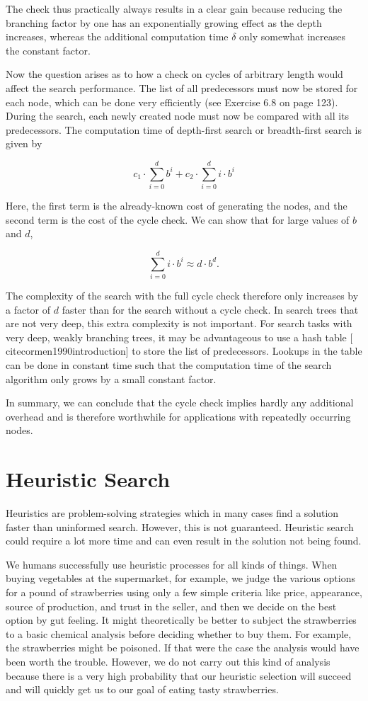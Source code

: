 \documentclass[10pt]{book}
\begin{document}
The check thus practically always results in a clear gain because reducing the branching factor by one has an exponentially growing effect as the depth increases, whereas the additional computation time $\delta$ only somewhat increases the constant factor.

Now the question arises as to how a check on cycles of arbitrary length would affect the search performance. The list of all predecessors must now be stored for each node, which can be done very efficiently (see Exercise 6.8 on page 123). During the search, each newly created node must now be compared with all its predecessors. The computation time of depth-first search or breadth-first search is given by

$$
c_{1} \cdot \sum_{i=0}^{d} b^{i}+c_{2} \cdot \sum_{i=0}^{d} i \cdot b^{i}
$$

Here, the first term is the already-known cost of generating the nodes, and the second term is the cost of the cycle check. We can show that for large values of $b$ and $d$,

$$
\sum_{i=0}^{d} i \cdot b^{i} \approx d \cdot b^{d} .
$$

The complexity of the search with the full cycle check therefore only increases by a factor of $d$ faster than for the search without a cycle check. In search trees that are not very deep, this extra complexity is not important. For search tasks with very deep, weakly branching trees, it may be advantageous to use a hash table [\\cite{cormen1990introduction}] to store the list of predecessors. Lookups in the table can be done in constant time such that the computation time of the search algorithm only grows by a small constant factor.

In summary, we can conclude that the cycle check implies hardly any additional overhead and is therefore worthwhile for applications with repeatedly occurring nodes.

\section{Heuristic Search}
Heuristics are problem-solving strategies which in many cases find a solution faster than uninformed search. However, this is not guaranteed. Heuristic search could require a lot more time and can even result in the solution not being found.

We humans successfully use heuristic processes for all kinds of things. When buying vegetables at the supermarket, for example, we judge the various options for a pound of strawberries using only a few simple criteria like price, appearance, source of production, and trust in the seller, and then we decide on the best option by gut feeling. It might theoretically be better to subject the strawberries to a basic chemical analysis before deciding whether to buy them. For example, the strawberries might be poisoned. If that were the case the analysis would have been worth the trouble. However, we do not carry out this kind of analysis because there is a very high probability that our heuristic selection will succeed and will quickly get us to our goal of eating tasty strawberries.
\end{document}

